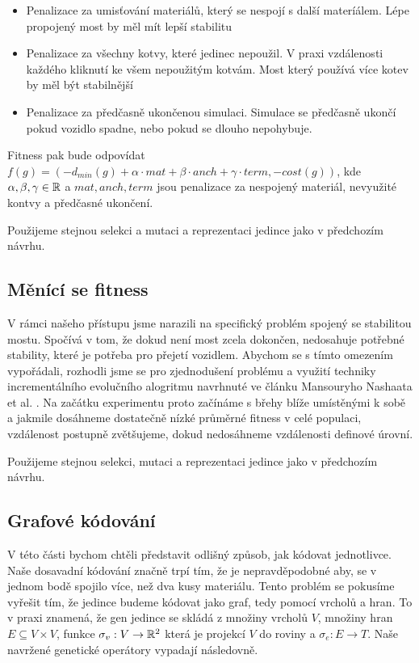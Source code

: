 \begin{itemize}
    \item Penalizace za umisťování materiálů, který se nespojí s další materíálem. Lépe propojený most by měl mít lepší stabilitu
    \item Penalizace za všechny kotvy, které jedinec nepoužil. V praxi vzdálenosti každého kliknutí ke všem nepoužitým kotvám. Most který používá více kotev by měl být stabilnější
    \item Penalizace za předčasně ukončenou simulaci. Simulace se předčasně ukončí pokud vozidlo spadne, nebo pokud se dlouho nepohybuje.
\end{itemize}

Fitness pak bude odpovídat $f(g) = (-d_{min}(g) + \alpha \cdot mat + \beta \cdot anch + \gamma \cdot term, -cost(g))$, kde $\alpha, \beta, \gamma \in \mathbb{R}$ a $mat, anch, term$ jsou penalizace za nespojený materiál, nevyužité kontvy a předčasné ukončení.

Použijeme stejnou selekci a mutaci a reprezentaci jedince jako v předchozím návrhu.

\subsection{Měnící se fitness}

V rámci našeho přístupu jsme narazili na specifický problém spojený se stabilitou mostu. Spočívá v tom, že dokud není most zcela dokončen, nedosahuje potřebné stability, které je potřeba pro přejetí vozidlem. Abychom se s tímto omezením vypořádali, rozhodli jsme se pro zjednodušení problému a využití techniky incrementálního evolučního alogritmu navrhnuté ve článku Mansouryho Nashaata et al. \cite{IGA}. Na začátku experimentu proto začínáme s břehy blíže umístěnými k sobě a jakmile dosáhneme dostatečně nízké průměrné fitness v celé populaci, vzdálenost postupně zvětšujeme, dokud nedosáhneme vzdálenosti definové úrovní. 

Použijeme stejnou selekci, mutaci a reprezentaci jedince jako v předchozím návrhu.

\subsection{Grafové kódování}

V této části bychom chtěli představit odlišný způsob, jak kódovat jednotlivce. Naše dosavadní kódování značně trpí tím, že je nepravděpodobné aby, se v jednom bodě spojilo více, než dva kusy materiálu. Tento problém se pokusíme vyřešit tím, že jedince budeme kódovat jako graf, tedy pomocí vrcholů a hran. To v praxi znamená, že gen jedince se skládá z množiny vrcholů $V$, množiny hran $E \subseteq V \times V$, funkce $\sigma_v : V \rightarrow \mathbb{R}^2$ která je projekcí $V$ do roviny a $\sigma_e : E \rightarrow T$. Naše navržené genetické operátory vypadají následovně.

